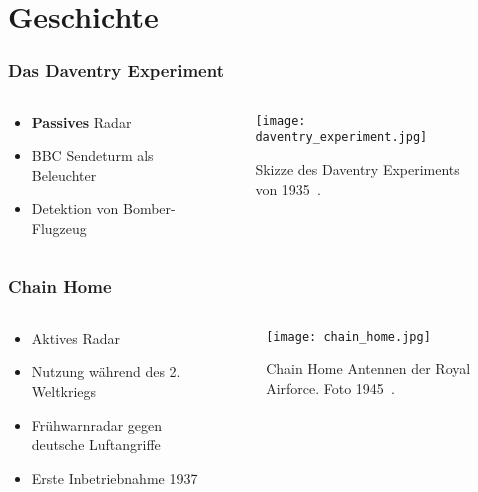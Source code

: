 \section{Geschichte}

\begin{frame}
    \frametitle{Das Daventry Experiment}

    \begin{columns}
        \begin{column}{0.5\textwidth}
            \begin{itemize}
                \item \textbf{Passives} Radar
                \item BBC Sendeturm als Beleuchter
                \item Detektion von Bomber-Flugzeug
            \end{itemize}
        \end{column}
        \begin{column}{0.5\textwidth}
            \begin{figure}
                \centering
                \texttt{[image: daventry\_experiment.jpg]}
                \caption{Skizze des Daventry Experiments von 1935~\cite{WattsonWatt1935}.}
            \end{figure}
        \end{column}
    \end{columns}
\end{frame}

\begin{frame}
    \frametitle{Chain Home}

    \begin{columns}
        \begin{column}{0.5\textwidth}
            \begin{itemize}
                \item Aktives Radar
                \item Nutzung während des 2. Weltkriegs
                \item Frühwarnradar gegen deutsche Luftangriffe
                \item Erste Inbetriebnahme 1937
            \end{itemize}
        \end{column}
        \begin{column}{0.5\textwidth}
            \begin{figure}
                \centering
                \texttt{[image: chain\_home.jpg]}
                \caption{Chain Home Antennen der Royal Airforce. Foto 1945~\cite{RoyalAirForce1945}.}
            \end{figure}
        \end{column}
    \end{columns}
\end{frame}

